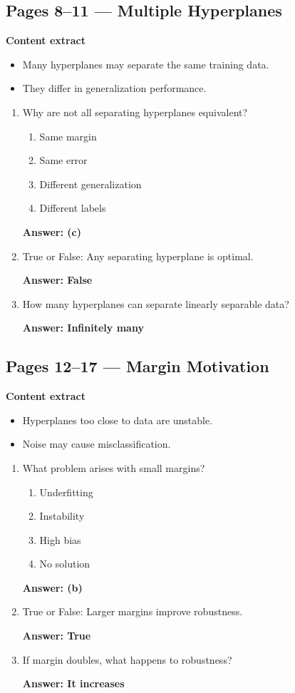\documentclass[12pt]{article}
\begin{document}
\subsection*{Pages 8--11 — Multiple Hyperplanes}

\textbf{Content extract}
\begin{itemize}
	\item Many hyperplanes may separate the same training data.
	\item They differ in generalization performance.
\end{itemize}

\begin{enumerate}
	\item Why are not all separating hyperplanes equivalent?
	\begin{enumerate}
		\item Same margin
		\item Same error
		\item Different generalization
		\item Different labels
	\end{enumerate}
	\textbf{Answer: (c)}
	
	\item True or False: Any separating hyperplane is optimal.
	
	\textbf{Answer: False}
	
	\item How many hyperplanes can separate linearly separable data?
	
	\textbf{Answer: Infinitely many}
\end{enumerate}



\subsection*{Pages 12--17 — Margin Motivation}

\textbf{Content extract}
\begin{itemize}
	\item Hyperplanes too close to data are unstable.
	\item Noise may cause misclassification.
\end{itemize}

\begin{enumerate}
	\item What problem arises with small margins?
	\begin{enumerate}
		\item Underfitting
		\item Instability
		\item High bias
		\item No solution
	\end{enumerate}
	\textbf{Answer: (b)}
	
	\item True or False: Larger margins improve robustness.
	
	\textbf{Answer: True}
	
	\item If margin doubles, what happens to robustness?
	
	\textbf{Answer: It increases}
\end{enumerate}
\end{document}
